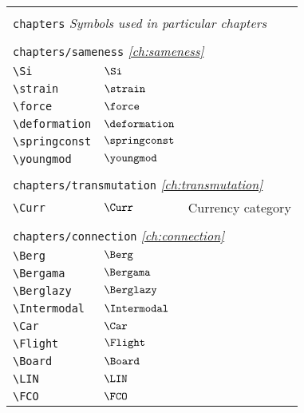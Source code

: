 \begin{longtable}{lll}
  &  & \\ 
 \multicolumn{3}{l}{{\color[rgb]{0.5,0.5,0.5}\texttt{chapters}} \emph{Symbols used in particular chapters}}\\ 
 \hline
\hline
 &  & \\ 
 \multicolumn{3}{l}{{\color[rgb]{0.5,0.5,0.5}\texttt{chapters/sameness}} \emph{\cref{ch:sameness}}}\\ 
 \hline
{\color[rgb]{0.5,0.5,0.5}\texttt{\textbackslash Si}} & $\Si$ & \\ 
 {\color[rgb]{0.5,0.5,0.5}\texttt{\textbackslash strain}} & $\strain$ & \\ 
 {\color[rgb]{0.5,0.5,0.5}\texttt{\textbackslash force}} & $\force$ & \\ 
 {\color[rgb]{0.5,0.5,0.5}\texttt{\textbackslash deformation}} & $\deformation$ & \\ 
 {\color[rgb]{0.5,0.5,0.5}\texttt{\textbackslash springconst}} & $\springconst$ & \\ 
 {\color[rgb]{0.5,0.5,0.5}\texttt{\textbackslash youngmod}} & $\youngmod$ & \\ 
  &  & \\ 
 \multicolumn{3}{l}{{\color[rgb]{0.5,0.5,0.5}\texttt{chapters/transmutation}} \emph{\cref{ch:transmutation}}}\\ 
 \hline
{\color[rgb]{0.5,0.5,0.5}\texttt{\textbackslash Curr}} & $\Curr$ &  Currency category\\ 
  &  & \\ 
 \multicolumn{3}{l}{{\color[rgb]{0.5,0.5,0.5}\texttt{chapters/connection}} \emph{\cref{ch:connection}}}\\ 
 \hline
{\color[rgb]{0.5,0.5,0.5}\texttt{\textbackslash Berg}} & $\Berg$ & \\ 
 {\color[rgb]{0.5,0.5,0.5}\texttt{\textbackslash Bergama}} & $\Bergama$ & \\ 
 {\color[rgb]{0.5,0.5,0.5}\texttt{\textbackslash Berglazy}} & $\Berglazy$ & \\ 
 {\color[rgb]{0.5,0.5,0.5}\texttt{\textbackslash Intermodal}} & $\Intermodal$ & \\ 
 {\color[rgb]{0.5,0.5,0.5}\texttt{\textbackslash Car}} & $\Car$ & \\ 
 {\color[rgb]{0.5,0.5,0.5}\texttt{\textbackslash Flight}} & $\Flight$ & \\ 
 {\color[rgb]{0.5,0.5,0.5}\texttt{\textbackslash Board}} & $\Board$ & \\ 
 {\color[rgb]{0.5,0.5,0.5}\texttt{\textbackslash LIN}} & $\LIN$ & \\ 
 {\color[rgb]{0.5,0.5,0.5}\texttt{\textbackslash FCO}} & $\FCO$ & \\ 

\end{longtable}
